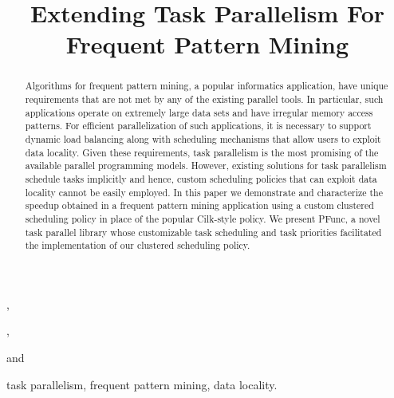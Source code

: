 \documentclass{IOS-Book-Article}
\begin{document}
\begin{frontmatter}                           
\title{Extending Task Parallelism For Frequent Pattern Mining}

\author[A]{},
\author[B]{},
\author[B]{} and
\author[A]{}

\address[A]{Open Systems Lab, Indiana University, Bloomington, IN - 47408}
\address[B]{IBM T J Watson Research Center, Yorktown Heights, NY - 10598}

\begin{abstract}
Algorithms for frequent pattern mining, a popular informatics application,
have unique requirements that are not met by any of the existing parallel 
tools. In particular, such applications operate on extremely large data
sets and have irregular memory access patterns. For efficient parallelization
of such applications, it is necessary to support dynamic load balancing
along with scheduling mechanisms that allow users to exploit data locality.  
Given these requirements, task parallelism is the most promising of the
available parallel programming models.  However, existing solutions for task
parallelism schedule tasks implicitly and hence, custom scheduling policies
that can exploit data locality cannot be easily employed.
In this paper we demonstrate and characterize the speedup obtained in a
frequent pattern mining application using a custom clustered scheduling
policy in place of the popular Cilk-style policy.  We present PFunc, a novel
task parallel library whose customizable task scheduling and task priorities
facilitated the implementation of our clustered scheduling policy.
\end{abstract}

\begin{keyword}
task parallelism, frequent pattern mining, data locality.
\end{keyword}

\end{frontmatter}
\end{document}

